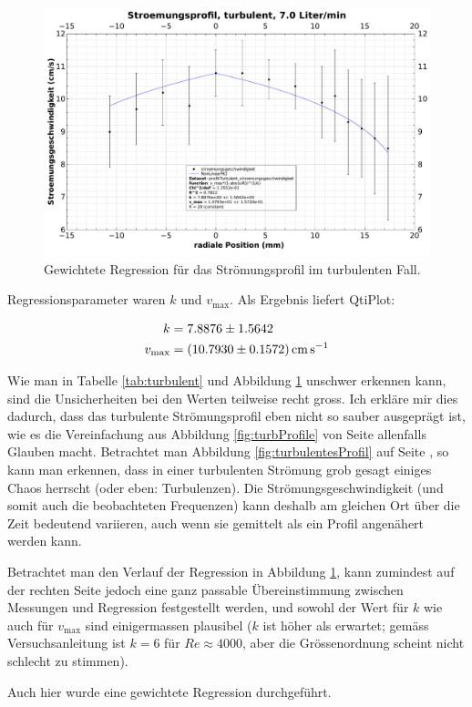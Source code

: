 \clearpage
\begin{samepage}
\begin{figure}[h!t]
    \centering
    \includegraphics[width=\textwidth]{images/profil-turbulent.pdf}
    \caption{Gewichtete Regression f\"ur das Str\"omungsprofil im turbulenten Fall.}
    \label{fig:profile:turb}
\end{figure}

Regressionsparameter  waren $k$  und $v_{\mathrm{max}}$. Als  Ergebnis liefert
QtiPlot:

\begin{align}
    \label{eq:profile:turb:regression:results:k}
    k &= 7.8876 \pm 1.5642
    \\
    \label{eq:profile:turb:regression:results:vmax}
    v_{\mathrm{max}} &= \SI{10.793 \pm 0.1572}{\centi\meter\per\second}
\end{align}

Wie man  in Tabelle  \ref{tab:turbulent} und  Abbildung \ref{fig:profile:turb}
unschwer erkennen kann, sind die Unsicherheiten bei den Werten teilweise recht
gross. Ich erkl\"are  mir dies dadurch, dass  das turbulente Str\"omungsprofil
eben  nicht  so  sauber  ausgepr\"agt   ist,  wie  es  die  Vereinfachung  aus
Abbildung \ref{fig:turbProfile} von Seite \pageref{fig:turbProfile} allenfalls
Glauben  macht. Betrachtet   man  Abbildung   \ref{fig:turbulentesProfil}  auf
Seite  \pageref{fig:turbulentesProfil},   so  kann   man  erkennen,   dass  in
einer  turbulenten  Str\"omung  grob   gesagt  einiges  Chaos  herrscht  (oder
eben: Turbulenzen). Die   Str\"omungsgeschwindigkeit  (und   somit  auch   die
beobachteten  Frequenzen)  kann  deshalb  am  gleichen  Ort  \"uber  die  Zeit
bedeutend  variieren, auch  wenn  sie gemittelt  als  ein Profil  angen\"ahert
werden kann.

Betrachtet man den Verlauf der Regression in Abbildung \ref{fig:profile:turb},
kann   zumindest   auf  der   rechten   Seite   jedoch  eine   ganz   passable
\"Ubereinstimmung zwischen  Messungen und Regression festgestellt  werden, und
sowohl der Wert f\"ur $k$ wie auch f\"ur $v_{\mathrm{max}}$ sind einigermassen
plausibel ($k$ ist  h\"oher als erwartet; gem\"ass Versuchsanleitung  ist $k =
6$ f\"ur $\mathit{Re}  \approx 4000$, aber die  Gr\"ossenordnung scheint nicht
schlecht zu stimmen).

Auch hier wurde eine gewichtete Regression durchgef\"uhrt.
\end{samepage}
